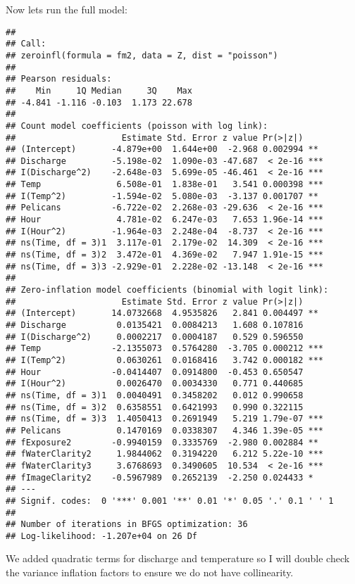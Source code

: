 \documentclass[]{article}
\begin{document}
Now lets run the full model:

\begin{verbatim}
## 
## Call:
## zeroinfl(formula = fm2, data = Z, dist = "poisson")
## 
## Pearson residuals:
##    Min     1Q Median     3Q    Max 
## -4.841 -1.116 -0.103  1.173 22.678 
## 
## Count model coefficients (poisson with log link):
##                     Estimate Std. Error z value Pr(>|z|)    
## (Intercept)       -4.879e+00  1.644e+00  -2.968 0.002994 ** 
## Discharge         -5.198e-02  1.090e-03 -47.687  < 2e-16 ***
## I(Discharge^2)    -2.648e-03  5.699e-05 -46.461  < 2e-16 ***
## Temp               6.508e-01  1.838e-01   3.541 0.000398 ***
## I(Temp^2)         -1.594e-02  5.080e-03  -3.137 0.001707 ** 
## Pelicans          -6.722e-02  2.268e-03 -29.636  < 2e-16 ***
## Hour               4.781e-02  6.247e-03   7.653 1.96e-14 ***
## I(Hour^2)         -1.964e-03  2.248e-04  -8.737  < 2e-16 ***
## ns(Time, df = 3)1  3.117e-01  2.179e-02  14.309  < 2e-16 ***
## ns(Time, df = 3)2  3.472e-01  4.369e-02   7.947 1.91e-15 ***
## ns(Time, df = 3)3 -2.929e-01  2.228e-02 -13.148  < 2e-16 ***
## 
## Zero-inflation model coefficients (binomial with logit link):
##                     Estimate Std. Error z value Pr(>|z|)    
## (Intercept)       14.0732668  4.9535826   2.841 0.004497 ** 
## Discharge          0.0135421  0.0084213   1.608 0.107816    
## I(Discharge^2)     0.0002217  0.0004187   0.529 0.596550    
## Temp              -2.1355073  0.5764280  -3.705 0.000212 ***
## I(Temp^2)          0.0630261  0.0168416   3.742 0.000182 ***
## Hour              -0.0414407  0.0914800  -0.453 0.650547    
## I(Hour^2)          0.0026470  0.0034330   0.771 0.440685    
## ns(Time, df = 3)1  0.0040491  0.3458202   0.012 0.990658    
## ns(Time, df = 3)2  0.6358551  0.6421993   0.990 0.322115    
## ns(Time, df = 3)3  1.4050413  0.2691949   5.219 1.79e-07 ***
## Pelicans           0.1470169  0.0338307   4.346 1.39e-05 ***
## fExposure2        -0.9940159  0.3335769  -2.980 0.002884 ** 
## fWaterClarity2     1.9844062  0.3194220   6.212 5.22e-10 ***
## fWaterClarity3     3.6768693  0.3490605  10.534  < 2e-16 ***
## fImageClarity2    -0.5967989  0.2652139  -2.250 0.024433 *  
## ---
## Signif. codes:  0 '***' 0.001 '**' 0.01 '*' 0.05 '.' 0.1 ' ' 1 
## 
## Number of iterations in BFGS optimization: 36 
## Log-likelihood: -1.207e+04 on 26 Df
\end{verbatim}

We added quadratic terms for discharge and temperature so I will double
check the variance inflation factors to ensure we do not have
collinearity.
\end{document}
